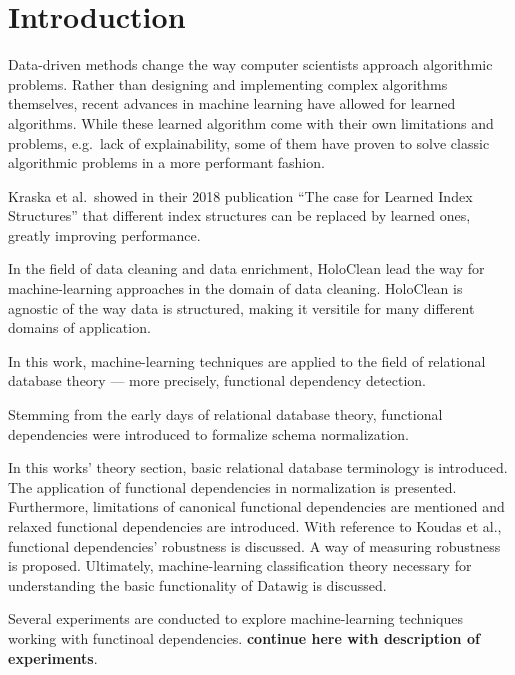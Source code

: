 \section{Introduction}
Data-driven methods change the way computer scientists approach algorithmic problems.
Rather than designing and implementing complex algorithms themselves, recent advances in machine learning have allowed for learned algorithms.
While these learned algorithm come with their own limitations and problems, e.g.\ lack of explainability, some of them have proven to solve classic algorithmic problems in a more performant fashion.

Kraska et al.\ showed in their 2018 publication ``The case for Learned Index Structures'' that different index structures can be replaced by learned ones, greatly improving performance.\cite{KRA18}

In the field of data cleaning and data enrichment, HoloClean lead the way for machine-learning approaches in the domain of data cleaning.\cite{HEI19}
HoloClean is agnostic of the way data is structured, making it versitile for many different domains of application.

In this work, machine-learning techniques are applied to the field of relational database theory --- more precisely, functional dependency detection.

Stemming from the early days of relational database theory, functional dependencies were introduced to formalize schema normalization.

In this works' theory section, basic relational database terminology is introduced.
The application of functional dependencies in normalization is presented.
Furthermore, limitations of canonical functional dependencies are mentioned and relaxed functional dependencies are introduced.
With reference to Koudas et al., functional dependencies' robustness is discussed.
A way of measuring robustness is proposed.
Ultimately, machine-learning classification theory necessary for understanding the basic functionality of Datawig\cite{BIE18} is discussed.

Several experiments are conducted to explore machine-learning techniques working with functinoal dependencies. \textbf{continue here with description of experiments}.
